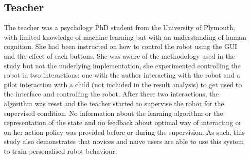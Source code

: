 \subsection{Teacher}
The teacher was a psychology PhD student from the University of Plymouth, with limited knowledge of machine learning but with an understanding of human cognition. She had been instructed on how to control the robot using the GUI and the effect of each buttons. She was aware of the methodology used in the study but not the underlying implementation, she experimented controlling the robot in two interactions: one with the author interacting with the robot and a pilot interaction with a child (not included in the result analysis) to get used to the interface and controlling the robot. After these two interactions, the algorithm was reset and the teacher started to supervise the robot for the supervised condition. No information about the learning algorithm or the representation of the state and no feedback about optimal way of interacting or on her action policy was provided before or during the supervision. As such, this study also demonstrates that novices and naive users are able to use this system to train personalised robot behaviour.



